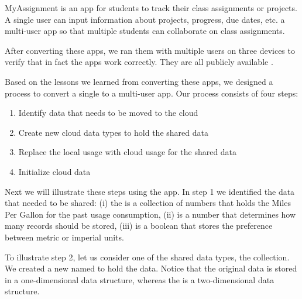 \documentclass[article]{sigplanconf}
\begin{document}
MyAssignment is an app for students to track their class assignments or projects.  A single user can input information about projects, progress, due dates, etc.   a multi-user app so that multiple students can collaborate on class assignments.

After converting these apps, we ran them with multiple users on three devices to verify that in fact the apps work correctly. They are all publicly available
.

Based on the lessons we learned from converting these \numFormative apps, we designed a process to convert  a single to a multi-user app.  Our process consists of four steps:   
\begin{enumerate}
\item Identify data that needs to be moved to the cloud

\item Create new cloud data types to hold the shared data

\item Replace the local usage with cloud usage for the shared data

\item Initialize cloud data
\end{enumerate}

Next we will illustrate these steps using the \MT app.  In step 1 we identified the data that needed to be shared: 
(i) the  is a collection of numbers that holds the Miles Per Gallon for the past usage consumption, 
(ii)  is a number that determines how many records should be stored, 
(iii)  is a boolean that stores the preference between metric or imperial units.
   
To illustrate step 2, let us consider one of the shared data types, the  collection. 
We created a new  named  to hold the data. Notice that the
original data is stored in a one-dimensional data structure, whereas the  is a two-dimensional data 
structure.
\end{document}
